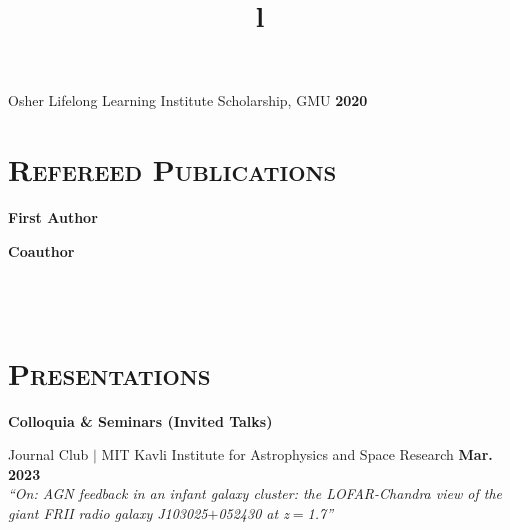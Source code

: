\documentclass[marg, centered]{res}
\begin{document}
\begin{resume}
{Osher Lifelong Learning Institute Scholarship, GMU \hfill \textbf{2020}}
\vspace{-0.0cm}


\section{{\scshape \bfseries Refereed Publications}}

\vspace{-0.1cm}
\textbf{First Author}
\vspace{0.05cm}

\textbf{Coauthor}
\vspace{0.05cm}
\vspace{0.05cm}


\begin{format}
\title{l} \\
 \\
\body
\end{format}

\section{{\scshape \bfseries Presentations} \\
\vspace{0.1cm}
}

\textbf{Colloquia \& Seminars (Invited Talks)}

\begin{talks}[itemindent=0pt, leftmargin=19pt]

\item Journal Club $|$ MIT Kavli Institute for Astrophysics and Space Research \hfill \textbf{Mar. 2023} \\
\textit{``On: AGN feedback in an infant galaxy cluster: the LOFAR-Chandra view of the giant FRII radio galaxy J103025$+$052430 at z$=$1.7''}


\end{talks}
\end{resume}
\end{document}

